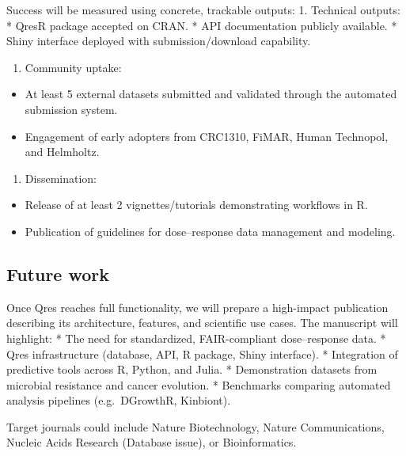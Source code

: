 \documentclass[
]{article}
\providecommand{\tightlist}{%
  \setlength{\itemsep}{0pt}\setlength{\parskip}{0pt}}
\begin{document}
Success will be measured using concrete, trackable outputs: 1. Technical
outputs: * QresR package accepted on CRAN. * API documentation publicly
available. * Shiny interface deployed with submission/download
capability.

\begin{enumerate}
\def\labelenumi{\arabic{enumi}.}
\setcounter{enumi}{1}
\tightlist
\item
  Community uptake:
\end{enumerate}

\begin{itemize}
\tightlist
\item
  At least 5 external datasets submitted and validated through the
  automated submission system.
\item
  Engagement of early adopters from CRC1310, FiMAR, Human Technopol, and
  Helmholtz.
\end{itemize}

\begin{enumerate}
\def\labelenumi{\arabic{enumi}.}
\setcounter{enumi}{2}
\tightlist
\item
  Dissemination:
\end{enumerate}

\begin{itemize}
\tightlist
\item
  Release of at least 2 vignettes/tutorials demonstrating workflows in
  R.
\item
  Publication of guidelines for dose--response data management and
  modeling.
\end{itemize}

\subsection{Future work}\label{future-work}

Once Qres reaches full functionality, we will prepare a high-impact
publication describing its architecture, features, and scientific use
cases. The manuscript will highlight: * The need for standardized,
FAIR-compliant dose--response data. * Qres infrastructure (database,
API, R package, Shiny interface). * Integration of predictive tools
across R, Python, and Julia. * Demonstration datasets from microbial
resistance and cancer evolution. * Benchmarks comparing automated
analysis pipelines (e.g.~DGrowthR, Kinbiont).

Target journals could include Nature Biotechnology, Nature
Communications, Nucleic Acids Research (Database issue), or
Bioinformatics.
\end{document}
